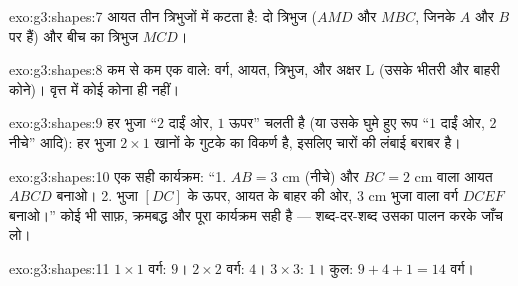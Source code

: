 \begin{solution}{exo:g3:shapes:7}
आयत तीन त्रिभुजों में कटता है: दो  त्रिभुज
($AMD$ और $MBC$, जिनके  $A$ और $B$ पर हैं) और बीच का
त्रिभुज $MCD$।
\end{solution}

\begin{solution}{exo:g3:shapes:8}
कम से कम एक  वाले: वर्ग, आयत, 
त्रिभुज, और अक्षर L (उसके भीतरी और बाहरी कोने)। वृत्त में
कोई कोना ही नहीं।
\end{solution}

\begin{solution}{exo:g3:shapes:9}
हर भुजा ``$2$ दाईं ओर, $1$ ऊपर'' चलती है (या उसके घुमे हुए रूप
``$1$ दाईं ओर, $2$ नीचे'' आदि): हर भुजा $2 \times 1$ खानों के
गुटके का विकर्ण है, इसलिए चारों की लंबाई बराबर है।
\end{solution}

\begin{solution}{exo:g3:shapes:10}
एक सही कार्यक्रम: ``1. $AB = 3$ cm (नीचे) और $BC = 2$ cm वाला
आयत $ABCD$ बनाओ। 2. भुजा $[DC]$ के ऊपर, आयत के बाहर की ओर,
$3$ cm भुजा वाला वर्ग $DCEF$ बनाओ।'' कोई भी साफ़, क्रमबद्ध और
पूरा कार्यक्रम सही है --- शब्द-दर-शब्द उसका पालन करके जाँच
लो।
\end{solution}

\begin{solution}{exo:g3:shapes:11}
$1 \times 1$ वर्ग: $9$। $2 \times 2$ वर्ग: $4$।
$3 \times 3$: $1$। कुल: $9 + 4 + 1 = 14$ वर्ग।

\end{solution}
